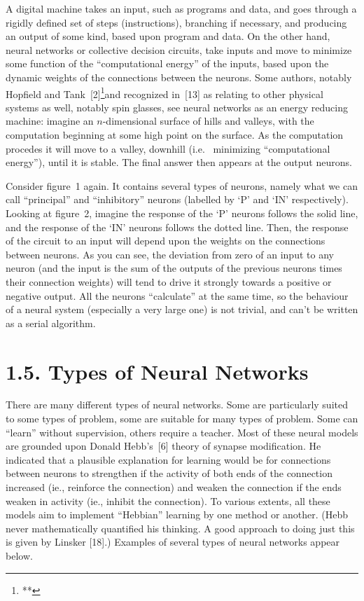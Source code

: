 \documentclass[12pt]{report}
\begin{document}
A digital machine takes an input, such as programs and data, and goes
through a rigidly defined set of steps (instructions), branching if
necessary, and producing an output of some kind, based upon program and
data.
On the other hand, neural networks or collective decision circuits, take 
inputs and move to minimize
some function of the ``computational energy'' of the inputs, based upon
the dynamic weights of the connections between the neurons. 
Some authors, notably Hopfield and Tank~[2]\footnote{**}{and recognized 
in~[13] as relating to other physical systems as well, notably spin glasses},
see neural networks as an energy
reducing machine: imagine an $n$-dimensional surface of hills and
valleys, with the computation beginning
at some high point on the surface.
As the computation procedes it will move to a valley, downhill (i.e.\ %
minimizing ``computational energy''), until it is stable.
The final answer then appears at the output neurons.

Consider figure~1 again.
It contains several types of neurons, namely what we can call
``principal'' and ``inhibitory'' neurons (labelled by `P' and `IN'
respectively).
Looking at figure~2, imagine the response of the `P' neurons follows the
solid line, and the response of the `IN' neurons follows the dotted line.
Then, the response of the circuit to an input will depend upon the
weights on the connections between neurons.
As you can see, the deviation from zero of an input to any 
neuron (and the input is
the sum of the outputs of the previous neurons times their connection
weights) will tend to drive it strongly towards a positive or negative
output.
All the neurons ``calculate'' at the same time, so the behaviour of a
neural system (especially a very large one) is not trivial, and can't be
written as a serial algorithm.

\section{1.5. Types of Neural Networks}

There are many different types of neural networks.
Some are particularly suited to some types of problem, some are suitable
for many types of problem.
Some can ``learn'' without supervision, others require a teacher.
Most of these neural models are grounded upon Donald
Hebb's~[6] theory of synapse modification.
He indicated that a plausible explanation for learning would be for
connections between neurons to strengthen if the activity of both ends of
the connection increased (ie., reinforce the connection) and weaken the
connection if the ends weaken in activity (ie., inhibit the connection).
To various extents, all these models aim to implement ``Hebbian''
learning by one method or another.
(Hebb never mathematically quantified his thinking.
A good approach to doing just this is given by Linsker [18].)
Examples of several types of neural networks appear below.
\end{document}
